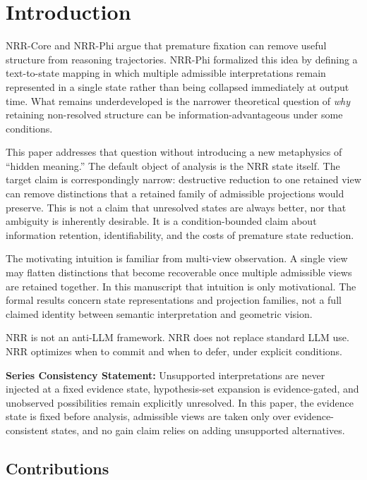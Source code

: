 \documentclass[11pt,a4paper]{article}
\begin{document}
\section{Introduction}
\label{sec:intro}

NRR-Core and NRR-Phi argue that premature fixation can remove useful structure from reasoning trajectories. NRR-Phi formalized this idea by defining a text-to-state mapping in which multiple admissible interpretations remain represented in a single state rather than being collapsed immediately at output time. What remains underdeveloped is the narrower theoretical question of \emph{why} retaining non-resolved structure can be information-advantageous under some conditions.

This paper addresses that question without introducing a new metaphysics of ``hidden meaning.'' The default object of analysis is the NRR state itself. The target claim is correspondingly narrow: destructive reduction to one retained view can remove distinctions that a retained family of admissible projections would preserve. This is not a claim that unresolved states are always better, nor that ambiguity is inherently desirable. It is a condition-bounded claim about information retention, identifiability, and the costs of premature state reduction.

The motivating intuition is familiar from multi-view observation. A single view may flatten distinctions that become recoverable once multiple admissible views are retained together. In this manuscript that intuition is only motivational. The formal results concern state representations and projection families, not a full claimed identity between semantic interpretation and geometric vision.

NRR is not an anti-LLM framework.
NRR does not replace standard LLM use.
NRR optimizes when to commit and when to defer, under explicit conditions.

\textbf{Series Consistency Statement:}
Unsupported interpretations are never injected at a fixed evidence state, hypothesis-set expansion is evidence-gated, and unobserved possibilities remain explicitly unresolved. In this paper, the evidence state is fixed before analysis, admissible views are taken only over evidence-consistent states, and no gain claim relies on adding unsupported alternatives.

\subsection{Contributions}
\end{document}
